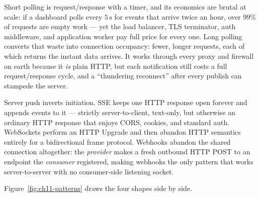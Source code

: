 Short polling is request/response with a timer, and its economics are brutal
at scale: if a dashboard polls every $5\,\mathrm{s}$ for events that arrive
twice an hour, over $99\%$ of requests are empty work --- yet the load
balancer, TLS terminator, auth middleware, and application worker pay full
price for every one. Long polling converts that waste into connection
occupancy: fewer, longer requests, each of which returns the instant data
arrives. It works through every proxy and firewall on earth because it
\emph{is} plain HTTP, but each notification still costs a full
request/response cycle, and a ``thundering reconnect'' after every publish
can stampede the server.

Server push inverts initiation. SSE keeps one HTTP response open forever and
appends events to it --- strictly server-to-client, text-only, but otherwise
an ordinary HTTP response that enjoys CORS, cookies, and standard auth.
WebSockets perform an HTTP Upgrade and then abandon HTTP semantics entirely
for a bidirectional frame protocol. Webhooks abandon the shared connection
altogether: the \emph{provider} makes a fresh outbound HTTP POST to an
endpoint the \emph{consumer} registered, making webhooks the only pattern
that works server-to-server with no consumer-side listening socket.

Figure~\ref{fig:ch11-patterns} draws the four shapes side by side.

